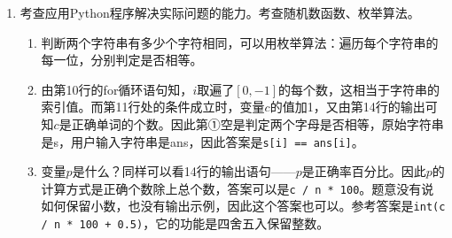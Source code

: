 \begin{enumerate}
\item 考查应用Python程序解决实际问题的能力。考查随机数函数、枚举算法。
	\begin{enumerate}[label=$(\alph*)$]
\setcounter{qnumber}{1}
\begin{lstlisting}[numbers=left]
import random
n = int(input("请输入要产生的英文字符串长度: "))
s = ""
for i in range(n):
	# randint(1,58):随机生成一个[1,58]范围内整数，字母A的ASCII码值为65
    s += chr(64 + random.randint(1, 58))  
print(s)
ans = input("请按样例输入: ")
c = 0
for i in range(n):
    if `\clozeblank{2}`:
        c += 1
p = `\clozeblank{2}`
print("正确数量: ", c, "，正确率为: ", p, "%")
\end{lstlisting}
	\item 判断两个字符串有多少个字符相同，可以用枚举算法：遍历每个字符串的每一位，分别判定是否相等。
	\item 由第10行的for循环语句知，$i$取遍了$[0,-1]$的每个数，这相当于字符串的索引值。而第11行处的条件成立时，变量$c$的值加1，又由第14行的输出可知$c$是正确单词的个数。因此第①空是判定两个字母是否相等，原始字符串是s，用户输入字符串是ans，因此答案是\lstinline|s[i] == ans[i]|。
	\item 变量$p$是什么？同样可以看14行的输出语句——$p$是正确率百分比。因此$p$的计算方式是正确个数除上总个数，答案可以是\lstinline|c / n * 100|。题意没有说如何保留小数，也没有输出示例，因此这个答案也可以。参考答案是\lstinline|int(c / n * 100 + 0.5)|，它的功能是四舍五入保留整数。
	\end{enumerate}



\end{enumerate}
